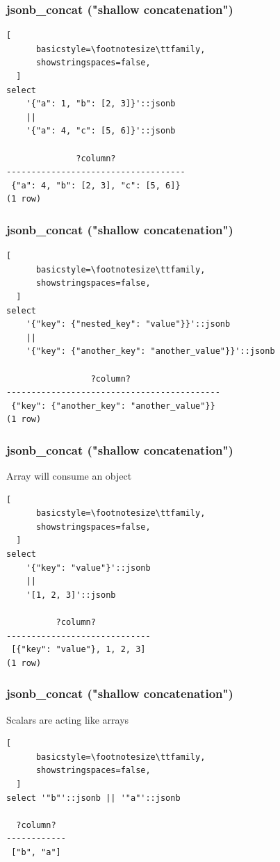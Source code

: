 \documentclass[14pt, compress, aspectratio=169]{beamer}
\begin{document}
\begin{frame}[fragile]
\frametitle{jsonb\_concat ("shallow concatenation")}

  \begin{lstlisting}[
      basicstyle=\footnotesize\ttfamily,
      showstringspaces=false,
  ]
select 
    '{"a": 1, "b": [2, 3]}'::jsonb
    ||
    '{"a": 4, "c": [5, 6]}'::jsonb

              ?column?              
------------------------------------
 {"a": 4, "b": [2, 3], "c": [5, 6]}
(1 row)

  \end{lstlisting}
\end{frame}

\begin{frame}[fragile]
\frametitle{jsonb\_concat ("shallow concatenation")}

  \begin{lstlisting}[
      basicstyle=\footnotesize\ttfamily,
      showstringspaces=false,
  ]
select 
    '{"key": {"nested_key": "value"}}'::jsonb
    ||
    '{"key": {"another_key": "another_value"}}'::jsonb

                 ?column?                  
-------------------------------------------
 {"key": {"another_key": "another_value"}}
(1 row)

  \end{lstlisting}
\end{frame}

\begin{frame}[fragile]
\frametitle{jsonb\_concat ("shallow concatenation")}
    Array will consume an object
  \begin{lstlisting}[
      basicstyle=\footnotesize\ttfamily,
      showstringspaces=false,
  ]
select 
    '{"key": "value"}'::jsonb
    ||
    '[1, 2, 3]'::jsonb 

          ?column?           
-----------------------------
 [{"key": "value"}, 1, 2, 3]
(1 row)

  \end{lstlisting}
\end{frame}

\begin{frame}[fragile]
\frametitle{jsonb\_concat ("shallow concatenation")}
    Scalars are acting like arrays
  \begin{lstlisting}[
      basicstyle=\footnotesize\ttfamily,
      showstringspaces=false,
  ]
select '"b"'::jsonb || '"a"'::jsonb

  ?column?  
------------
 ["b", "a"]

  \end{lstlisting}
\end{frame}
\end{document}
